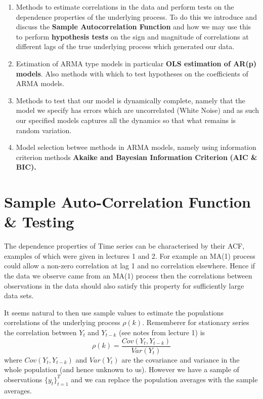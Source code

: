 \documentclass[openany]{tufte-book} %
\begin{document}
 \begin{enumerate}
 \item
  Methods to estimate correlations in the data and perform tests on the dependence properties of the underlying process. To do this we introduce and discuss the \textbf{Sample Autocorrelation Function} and how we may use this  to perform \textbf{ hypothesis tests }on the sign and magnitude of correlations at different lags of the true underlying process which generated our data.

  \item Estimation of ARMA type models in particular \textbf{OLS estimation of AR(p) models}. Also methods with which to test hypotheses on the coefficients of  ARMA  models.
  
  \item Methods to test that our model is dynamically complete, namely that the model we specify has errors which are uncorrelated (White Noise) and as such our specified models captures all the dynamics so that what remains is random variation.

  \item Model selection betwee methods in ARMA models, namely using information criterion methods  \textbf{Akaike and Bayesian Information Criterion}  \textbf{(AIC \& BIC).}
   \end{enumerate}



 \section{Sample Auto-Correlation Function \& Testing}
 The dependence properties of Time series can be characterised  by their ACF, examples of which were given in lectures 1 and 2. For example  an MA(1) process could allow a non-zero correlation at lag 1 and no correlation elsewhere.  Hence if the data we observe came from an MA(1) process then the correlations between observations in the data should also satisfy this property for sufficiently large data sets.


It seems natural to then use sample values to estimate the populations correlations of the underlying process $\rho(k)$. Rememberer for stationary series the correlation between $Y_t$ and $Y_{t-k}$ (see notes from lecture 1) is
\begin{equation*} \rho(k)=\frac{Cov(Y_t, Y_{t-k})}{Var(Y_{t})} \end{equation*}
where $Cov(Y_t, Y_{t-k})$ and $Var(Y_{t})$ are the covariance and variance in the whole population (and hence unknown to us). However we have a sample of observations $\{y_t\}_{t=1}^T$ and we can replace the population averages with the sample averages.
\end{document}
